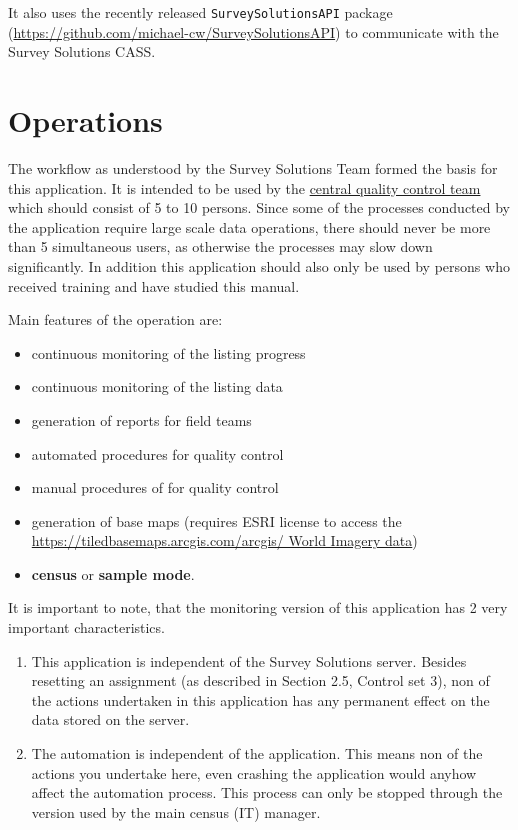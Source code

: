 \documentclass[a4paper]{article}
\providecommand{\tightlist}{%
  \setlength{\itemsep}{0pt}\setlength{\parskip}{0pt}}
\begin{document}
It also uses the recently released \texttt{SurveySolutionsAPI} package (\url{https://github.com/michael-cw/SurveySolutionsAPI}) to communicate with the Survey Solutions CASS.

\newpage

\hypertarget{operations}{%
\section{Operations}\label{operations}}

The workflow as understood by the Survey Solutions Team formed the basis for this application. It is intended to be used by the \underline{central quality control team} which should consist of 5 to 10 persons. Since some of the processes conducted by the application require large scale data operations, there should never be more than 5 simultaneous users, as otherwise the processes may slow down significantly. In addition this application should also only be used by persons who received training and have studied this manual.

Main features of the operation are:

\begin{itemize}
\tightlist
\item
  continuous monitoring of the listing progress
\item
  continuous monitoring of the listing data
\item
  generation of reports for field teams
\item
  automated procedures for quality control
\item
  manual procedures of for quality control
\item
  generation of base maps (requires ESRI license to access the \url{https://tiledbasemaps.arcgis.com/arcgis/ World Imagery data})
\item
  \textbf{census} or \textbf{sample mode}.
\end{itemize}

\begin{tcolorbox}[colback=red!5,colframe=red!40!black,title=Important]
It is important to note, that the monitoring version of this application has 2 very important characteristics.
\begin{enumerate}
    \item This application is independent of the Survey Solutions server. Besides resetting an assignment (as described in Section 2.5, Control set 3), non of the actions undertaken in this application has any permanent effect on the data stored on the server.
    \item The automation is independent of the application. This means non of the actions you undertake here, even crashing the application would anyhow affect the automation process. This process can only be stopped through the version used by the main census (IT) manager.
\end{enumerate}
\end{tcolorbox}
\newpage
\end{document}
